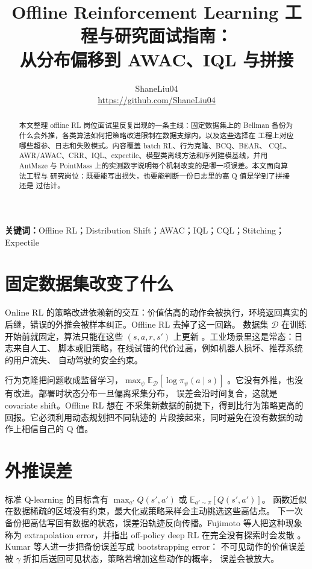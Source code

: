 \documentclass[10pt,twocolumn,a4paper]{ctexart}
\title{\vspace{-1.2em}\textbf{Offline Reinforcement Learning 工程与研究面试指南：\\
从分布偏移到 AWAC、IQL 与拼接}}
\author{ShaneLiu04\\
\small\url{https://github.com/ShaneLiu04}}
\date{}
\begin{document}
\maketitle
\thispagestyle{fancy}

\begin{abstract}
本文整理 offline RL 岗位面试里反复出现的一条主线：固定数据集上的 Bellman
备份为什么会外推，各类算法如何把策略改进限制在数据支撑内，以及这些选择在
工程上对应哪些超参、日志和失败模式。内容覆盖 batch RL、行为克隆、BCQ、BEAR、
CQL、AWR/AWAC、CRR、IQL、expectile、模型类离线方法和序列建模基线，并用 AntMaze
与 PointMass 上的实测数字说明每个机制改变的是哪一项误差。本文面向算法工程与
研究岗位：既要能写出损失，也要能判断一份日志里的高 Q 值是学到了拼接还是
过估计。
\end{abstract}

\textbf{关键词：}Offline RL；Distribution Shift；AWAC；IQL；CQL；Stitching；Expectile

\section{固定数据集改变了什么}
Online RL 的策略改进依赖新的交互：价值估高的动作会被执行，环境返回真实的
后继，错误的外推会被样本纠正\citep{sutton2018rl}。Offline RL 去掉了这一回路。
数据集 $\mathcal{D}$ 在训练开始前就固定，算法只能在这些 $(s,a,r,s')$ 上更新
\citep{lange2012batch,levine2020offline}。工业场景里这是常态：日志来自人工、
脚本或旧策略，在线试错的代价过高，例如机器人损坏、推荐系统的用户流失、
自动驾驶的安全约束。

行为克隆把问题收成监督学习，$\max_\psi\mathbb{E}_{\mathcal{D}}[\log\pi_\psi(a\mid s)]$
\citep{pomerleau1991bc}。它没有外推，也没有改进。部署时状态分布一旦偏离采集分布，
误差会沿时间复合，这就是 covariate shift\citep{ross2011dagger}。Offline RL 想在
不采集新数据的前提下，得到比行为策略更高的回报。它必须利用动态规划把不同轨迹的
片段接起来，同时避免在没有数据的动作上相信自己的 Q 值。

\section{外推误差}
标准 Q-learning 的目标含有 $\max_{a'}Q(s',a')$ 或 $\mathbb{E}_{a'\sim\pi}[Q(s',a')]$。
函数近似在数据稀疏的区域没有约束，最大化或策略采样会主动挑选这些高估点。
下一次备份把高估写回有数据的状态，误差沿轨迹反向传播。Fujimoto 等人把这种现象
称为 extrapolation error，并指出 off-policy deep RL 在完全没有探索时会发散
\citep{fujimoto2019bcq}。Kumar 等人进一步把备份误差写成 bootstrapping error：
不可见动作的价值误差被 $\gamma$ 折扣后送回可见状态，策略若增加这些动作的概率，
误差会被放大\citep{kumar2019bear}。
\end{document}
